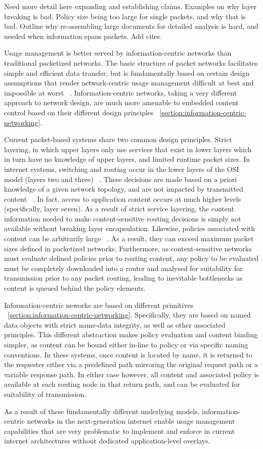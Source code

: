 \label{section:capabilities}
\color{red}
Need more detail here expanding and establishing claims.  Examples on why layer breaking is bad.  Policy size being too large for single packets, and why that is bad.  Outline why re-assembling large documents for detailed analysis is hard, and needed when information spans packets.  Add cites.
\color{black}

Usage management is better served by information-centric networks than traditional packetized networks.  The basic structure of packet networks facilitates simple and efficient data transfer, but is fundamentally based on certain design assumptions that render network-centric usage management difficult at best and impossible at worst ~\cite{Cl:88,SaReCl:84}.  Information-centric networks, taking a very different approach to network design, are much more amenable to embedded content control based on their different design principles ~\ref{section:information-centric-networking}.

Current packet-based systems share two common design principles.  Strict layering, in which upper layers only use services that exist in lower layers which in turn have no knowledge of upper layers, and limited runtime packet sizes.  In internet systems, switching and routing occur in the lower layers of the OSI model (layers two and three) ~\cite{TODO}.  These decisions are made based on a priori knowledge of a given network topology, and are not impacted by transmitted content ~\cite{TODO}.  In fact, access to application content occurs at much higher levels (specifically, layer seven).  As a result of strict service layering, the content information needed to make content-sensitive routing decisions is simply not available without breaking layer encapsulation.  Likewise, policies associated with content can be arbitrarily large ~\cite{TODO}.  As a result, they can exceed maximum packet sizes defined in packetized networks.  Furthermore, as content-sensitive networks must evaluate defined policies prior to routing content, any policy to be evaluated must be completely downloaded into a router and analysed for suitability for transmission prior to any packet routing, leading to inevitable bottlenecks as content is queued behind the policy elements.

Information-centric neworks are based on different primitives ~\ref{section:information-centric-networking}.  Specifically, they are based on named data objects with strict name-data integrity, as well as other associated principles.  This different abstraction makes policy evaluation and content binding simpler, as content can be bound either in-line to policy or via specific naming conventions.  In these systems, once content is located by name, it is returned to the requester either via a predefined path mirroring the original request path or a variable response path.  In either case however, all content and associated policy is available at each routing node in that return path, and can be evaluated for suitability of transmission.

As a result of these fundamentally different underlying models, information-centric networks in the next-generation internet enable usage management capabilities that are very problematic to implement and enforce in current internet architectures without dedicated application-level overlays.